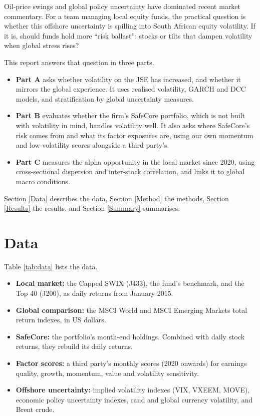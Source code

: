 \documentclass[11pt,preprint]{elsarticle}
\numberwithin{equation}{section}
\numberwithin{figure}{section}
\numberwithin{table}{section}
\def\tightlist{} %
\begin{document}
Oil-price swings and global policy uncertainty have dominated recent
market commentary. For a team managing local equity funds, the practical
question is whether this offshore uncertainty is spilling into South
African equity volatility. If it is, should funds hold more ``risk
ballast'': stocks or tilts that dampen volatility when global stress
rises?

This report answers that question in three parts.

\begin{itemize}
\tightlist
\item
  \textbf{Part A} asks whether volatility on the JSE has increased, and
  whether it mirrors the global experience. It uses realised volatility,
  GARCH and DCC models, and stratification by global uncertainty
  measures.
\item
  \textbf{Part B} evaluates whether the firm's SafeCore portfolio, which
  is not built with volatility in mind, handles volatility well. It also
  asks where SafeCore's risk comes from and what its factor exposures
  are, using our own momentum and low-volatility scores alongside a
  third party's.
\item
  \textbf{Part C} measures the alpha opportunity in the local market
  since 2020, using cross-sectional dispersion and inter-stock
  correlation, and links it to global macro conditions.
\end{itemize}

Section \ref{Data} describes the data, Section \ref{Method} the methods,
Section \ref{Results} the results, and Section \ref{Summary} summarises.

\section{\texorpdfstring{Data \label{Data}}{Data }}\label{data}

Table \ref{tab:data} lists the data.

\begin{itemize}
\tightlist
\item
  \textbf{Local market:} the Capped SWIX (J433), the fund's benchmark,
  and the Top 40 (J200), as daily returns from January 2015.
\item
  \textbf{Global comparison:} the MSCI World and MSCI Emerging Markets
  total return indexes, in US dollars.
\item
  \textbf{SafeCore:} the portfolio's month-end holdings. Combined with
  daily stock returns, they rebuild its daily returns.
\item
  \textbf{Factor scores:} a third party's monthly scores (2020 onwards)
  for earnings quality, growth, momentum, value and volatility
  sensitivity.
\item
  \textbf{Offshore uncertainty:} implied volatility indexes (VIX, VXEEM,
  MOVE), economic policy uncertainty indexes, rand and global currency
  volatility, and Brent crude.
\end{itemize}
\end{document}
